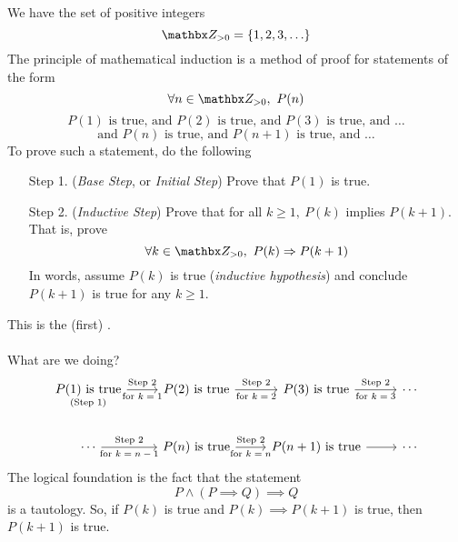 \vspace*{1em}

\begin{discussion}
We have the set of positive integers
\[\zz_{>0} = \set{1,2,3,\ldots}\]
The principle of mathematical induction is a method of proof for statements of the form
\[\forall n \in \zz_{>0},\ P(n)\]
\[\text{$P(1)$ is true, and $P(2)$ is true, and $P(3)$ is true, and $\ldots$}\]
\[\text{and $P(n)$ is true, and $P(n+1)$ is true, and $\ldots$}\]
To prove such a statement, do the following
\begin{itemize}[leftmargin=4em]
\item[Step 1.] (\emph{Base Step}, or \emph{Initial Step}) Prove that $P(1)$ is true.
\item[Step 2.] (\emph{Inductive Step}) Prove that for all $k \geq 1,\ P(k)$ implies $P(k + 1)$. That is, prove 
\[\forall k \in \zz_{>0},\ P(k) \implies P(k+1)\]
In words, assume $P(k)$ is true (\emph{inductive hypothesis}) and conclude $P(k+1)$ is true for any $k \geq 1$.
\end{itemize}
This is the {\color{blue}(first)} .\\
\\
What are we doing?
\[\begin{tikzcd}
\underset{\text{(Step 1)}}{\text{$P(1)$ is true}} \arrow[r, "{\text{\scriptsize for $k=1$}}"',draw=none]\arrow[r, "\text{Step 2}"] & \text{$P(2)$ is true} \arrow[r, "{\text{\scriptsize for $k=2$}}"',draw=none]\arrow[r, "\text{Step 2}"] & \text{$P(3)$ is true}  \arrow[r, "{\text{\scriptsize for $k=3$}}"',draw=none]\arrow[r, "\text{Step 2}"] &       \cdots \\
\cdots  \arrow[r, "{\text{\scriptsize for $k=n-1$}}"',draw=none]\arrow[r, "\text{Step 2}"]  & \text{$P(n)$ is true} \arrow[r, "{\text{\scriptsize for $k=n$}}"',draw=none]\arrow[r, "\text{Step 2}"] & \text{$P(n+1)$ is true} \arrow[r] & \cdots
\end{tikzcd}\]
The logical foundation is the fact that the statement \[P \land (P \implies Q) \implies Q\] is a tautology. So, if $P(k)$ is true and $P(k) \implies P(k+1)$ is true, then $P(k+1)$ is true. 
\end{discussion}


